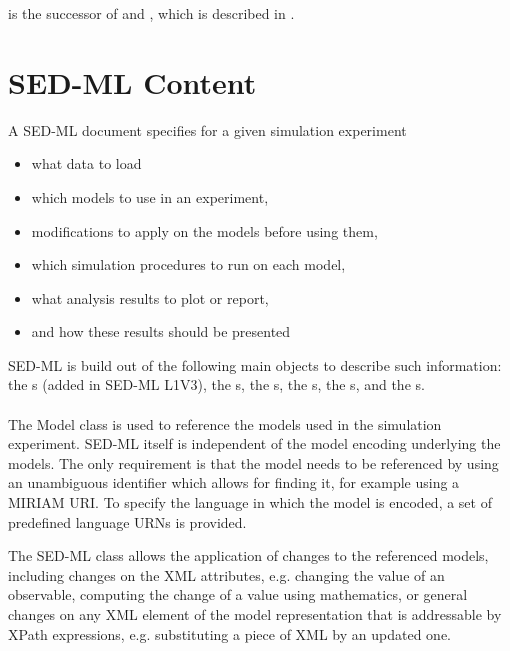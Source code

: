 \currentLV is the successor of \previousLV and \LoneVone, which is described in \citep{WAB+11}.

\section{SED-ML Content}
A SED-ML document specifies for a given simulation experiment

\begin{itemize}
\item what data to load
\item which models to use in an experiment,
\item modifications to apply on the models before using them,
\item which simulation procedures to run on each model,
\item what analysis results to plot or report,
\item and how these results should be presented
\end{itemize}

SED-ML is build out of the following main objects to describe such information: the s (added in SED-ML L1V3), the s, the s, the s, the s, and the s.

\paragraph{}

\paragraph{}
The Model class is used to reference the models used in the simulation experiment. SED-ML itself is independent of the model encoding underlying the models. The only requirement is that the model needs to be referenced by using an unambiguous identifier which allows for finding it, for example using a MIRIAM URI. To specify the language in which the model is encoded, a set of predefined language URNs is provided.

The SED-ML  class allows the application of changes to the referenced models, including changes on the XML attributes, e.g. changing the value of an observable, computing the change of a value using mathematics, or general changes on any XML element of the model representation that is addressable by XPath expressions, e.g. substituting a piece of XML by an updated one.

